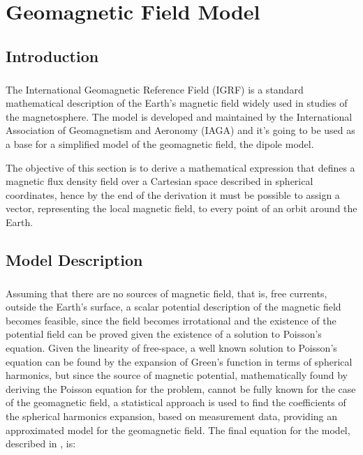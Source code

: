 %
%
%
%
%
%
%
%
%
%

\chapter{Geomagnetic Field Model} \label{ch:geomagnetic-field-model}

\section{Introduction}

\paragraph{}
\indent 
The International Geomagnetic Reference Field (IGRF) is a standard mathematical description of the Earth's magnetic field widely used in studies of the magnetosphere. The model is developed and maintained by the International Association of Geomagnetism and Aeronomy (IAGA) and it's going to be used as a base for a simplified model of the geomagnetic field, the dipole model.

\indent
The objective of this section is to derive a mathematical expression that defines a magnetic flux density field over a Cartesian space described in spherical coordinates, hence by the end of the derivation it must be possible to assign a vector, representing the local magnetic field, to every point of an orbit around the Earth. 

\section{Model Description}

\paragraph{}
\indent

Assuming that there are no sources of magnetic field, that is, free currents, outside the Earth's surface, a scalar potential description of the magnetic field becomes feasible, since the field becomes irrotational and the existence of the potential field can be proved given the existence of a solution to Poisson's equation. Given the linearity of free-space, a well known solution to Poisson's equation can be found by the expansion of Green's function in terms of spherical harmonics, but since the source of magnetic potential, mathematically found by deriving the Poisson equation for the problem, cannot be fully known for the case of the geomagnetic field, a statistical approach is used to find the coefficients of the spherical harmonics expansion, based on measurement data, providing an approximated model for the geomagnetic field. The final equation for the model, described in \cite{ET}, is: 

